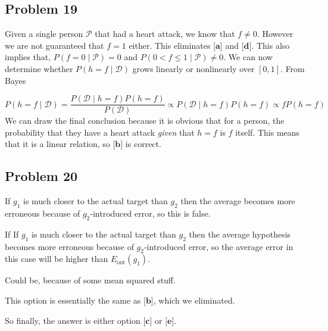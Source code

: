 \documentclass{article}
\begin{document}
\subsection*{Problem 19}
Given a single person $\mathcal{P}$ that had a heart attack, we know that $f \neq 0$. However we are not guaranteed that $f = 1$ either. This eliminates $\textbf{[a]}$ and $\textbf{[d]}$. This also implies that, $P(f=0 \mid \mathcal{P})=0$ and $P(0<f\leq 1 \mid \mathcal{P})\neq 0$. We can now determine whether $P(h=f \mid \mathcal{D})$ grows linearly or nonlinearly over $[0,1]$. From Bayes

$$
P(h=f \mid \mathcal{D})=\frac{P(\mathcal{D} \mid h=f) P(h=f)}{P(\mathcal{D})} \propto P(\mathcal{D} \mid h=f) P(h=f) \propto f P(h=f)
$$
We can draw the final conclusion because it is obvious that for a person, the probability that they have a heart attack \emph{given} that $h = f$ is $f$ itself. This means that it is a linear relation, so $\textbf{[b]}$ is correct.
\subsection*{Problem 20}
\begin{enumerate}[label=\textbf{[\alph*]}]
    \item If $g_1$ is much closer to the actual target than $g_2$ then the average becomes more erroneous because of $g_2$-introduced error, so this is false.
    \item If If $g_1$ is much closer to the actual target than $g_2$ then the average hypothesis becomes more erroneous because of $g_2$-introduced error, so the average error in this case will be higher than $E_{\text{out}}(g_1)$.
    \item Could be, because of some mean squared stuff.
    \item This option is essentially the same as $\textbf{[b]}$, which we eliminated.
\end{enumerate}
So finally, the answer is either option $\textbf{[c]}$ or $\textbf{[e]}$.

\end{document}
